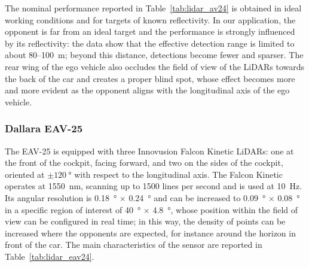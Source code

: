 The nominal performance reported in Table~\ref{tab:lidar_av24} is obtained in ideal
working conditions and for targets of known reflectivity. In our application, the
opponent is far from an ideal target and the performance is strongly influenced by its
reflectivity: the data show that the effective detection range is limited to about
80--\SI{100}{m}; beyond this distance, detections become fewer and sparser. The rear wing of the ego vehicle also occludes the field of view of the LiDARs
towards the back of the car and creates a proper blind spot, whose effect becomes more
and more evident as the opponent aligns with the longitudinal axis of the ego vehicle.

\subsubsection{Dallara EAV-25}

The EAV-25 is equipped with three Innovusion Falcon Kinetic LiDARs: one at the front of
the cockpit, facing forward, and two on the sides of the cockpit, oriented at
$\pm\SI{120}{\degree}$ with respect to the longitudinal axis. The Falcon Kinetic operates at \SI{1550}{nm},  scanning up to 1500 lines
per second and is used at \SI{10}{Hz}. Its angular resolution is
\SI{0.18}{\degree} $\times$ \SI{0.24}{\degree} and can be increased to
\SI{0.09}{\degree} $\times$ \SI{0.08}{\degree} in a specific region of interest of
\SI{40}{\degree} $\times$ \SI{4.8}{\degree}, whose position within the field of view can be
configured in real time; in this way, the density of points can be increased where the
opponents are expected, for instance around the horizon in front of the car. The main
characteristics of the sensor are reported in
Table~\ref{tab:lidar_eav24}.

